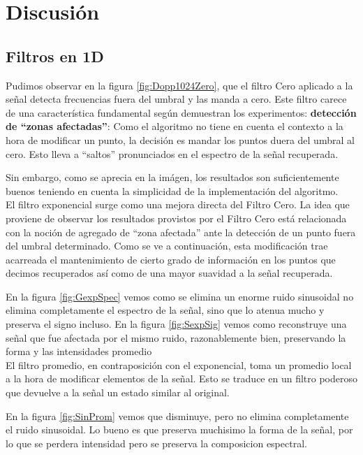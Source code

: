 \section{Discusi\'on}

\subsection{Filtros en 1D}

Pudimos observar en la figura \ref{fig:Dopp1024Zero}, que el filtro Cero
aplicado a la se\~nal detecta frecuencias fuera del umbral y
las manda a cero. Este filtro carece de una caracter\'istica fundamental
seg\'un demuestran los experimentos:
{\bf detecci\'on de ``zonas afectadas''}: Como el algoritmo no tiene en
cuenta el contexto a la hora de modificar un punto, la decisi\'on es mandar los
puntos duera del umbral al cero. Esto lleva a ``saltos'' pronunciados en
el espectro de la se\~nal recuperada.

Sin embargo, como se aprecia en la im\'agen, los resultados son suficientemente
buenos teniendo en cuenta la simplicidad de la implementaci\'on del algoritmo.\\




El filtro exponencial surge como una mejora directa del Filtro Cero.
La idea que proviene de
observar los resultados provistos por el Filtro Cero est\'a relacionada con la
noci\'on de agregado de ``zona afectada'' ante la detecci\'on de un punto fuera
del umbral determinado. Como se ve a continuaci\'on, esta modificaci\'on trae
acarreada el mantenimiento de cierto grado de informaci\'on en los puntos que
decimos recuperados as\'i como de una mayor suavidad a la se\~nal recuperada.

En la figura \ref{fig:GexpSpec} vemos como se elimina un enorme ruido
sinusoidal no elimina completamente el espectro de la se\~nal, sino que
lo atenua mucho y preserva el signo incluso. En la figura \ref{fig:SexpSig} vemos
como reconstruye una se\~nal que fue afectada por el mismo ruido, razonablemente
bien, preservando la forma y las intensidades promedio\\


El filtro promedio, en contraposici\'on con el exponencial, toma un promedio
local a la hora de modificar elementos de la se\~nal. Esto se traduce en un
filtro poderoso que devuelve a la se\~nal un estado similar al original.

En la figura \ref{fig:SinProm} vemos que disminuye, pero no elimina completamente
el ruido sinusoidal. Lo bueno es que preserva muchisimo la forma de la
se\~nal, por lo que se perdera intensidad pero se preserva la composicion
espectral.\\



